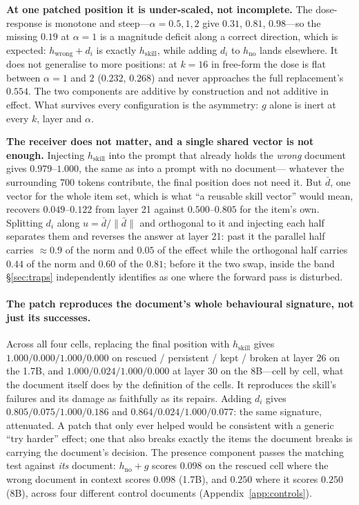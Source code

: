 \documentclass{article}
\newcommand{\dvec}{\ensuremath{d}}
\newcommand{\gvec}{\ensuremath{g}}
\begin{document}
\textbf{At one patched position it is under-scaled, not incomplete.} The
dose-response is monotone and steep---$\alpha=0.5,1,2$ give $0.31$, $0.81$,
$0.98$---so the missing $0.19$ at $\alpha=1$ is a magnitude deficit along a
correct direction, which is expected: $h_{\text{wrong}} + \dvec_i$ is exactly
$h_{\text{skill}}$, while adding $\dvec_i$ to $h_{\text{no}}$ lands elsewhere.
It does not generalise to more positions: at $k=16$ in free-form the dose is
flat between $\alpha=1$ and $2$ ($0.232$, $0.268$) and never approaches the full
replacement's $0.554$. The two components are additive by construction and not
additive in effect. What survives every configuration is the asymmetry: $\gvec$
alone is inert at every $k$, layer and $\alpha$.

\textbf{The receiver does not matter, and a single shared vector is not enough.}
Injecting $h_{\text{skill}}$ into the prompt that already holds the \emph{wrong}
document gives $0.979$--$1.000$, the same as into a prompt with no document---%
whatever the surrounding 700 tokens contribute, the final position does not need
it. But $\bar{\dvec}$, one vector for the whole item set, which is what ``a
reusable skill vector'' would mean, recovers $0.049$--$0.122$ from layer 21
against $0.500$--$0.805$ for the item's own. Splitting $\dvec_i$ along
$u=\bar{\dvec}/\|\bar{\dvec}\|$ and orthogonal to it and injecting each half
separates them and reverses the answer at layer 21: past it the parallel half
carries $\approx 0.9$ of the norm and $0.05$ of the effect while the orthogonal
half carries $0.44$ of the norm and $0.60$ of the $0.81$; before it the two swap,
inside the band \S\ref{sec:traps} independently identifies as one where the
forward pass is disturbed.

\paragraph{The patch reproduces the document's whole behavioural signature, not
just its successes.} Across all four cells, replacing the final position with
$h_{\text{skill}}$ gives $1.000 / 0.000 / 1.000 / 0.000$ on
rescued / persistent / kept / broken at layer 26 on the 1.7B, and
$1.000 / 0.024 / 1.000 / 0.000$ at layer 30 on the 8B---cell by cell, what the
document itself does by the definition of the cells. It reproduces the skill's
failures and its damage as faithfully as its repairs. Adding $\dvec_i$ gives
$0.805 / 0.075 / 1.000 / 0.186$ and $0.864 / 0.024 / 1.000 / 0.077$: the same
signature, attenuated. A patch that only ever helped would be consistent with a
generic ``try harder'' effect; one that also breaks exactly the items the
document breaks is carrying the document's decision. The presence component
passes the matching test against \emph{its} document: $h_{\text{no}}+\gvec$
scores $0.098$ on the rescued cell where the wrong document in context scores
$0.098$ (1.7B), and $0.250$ where it scores $0.250$ (8B), across four different
control documents (Appendix~\ref{app:controls}).
\end{document}
